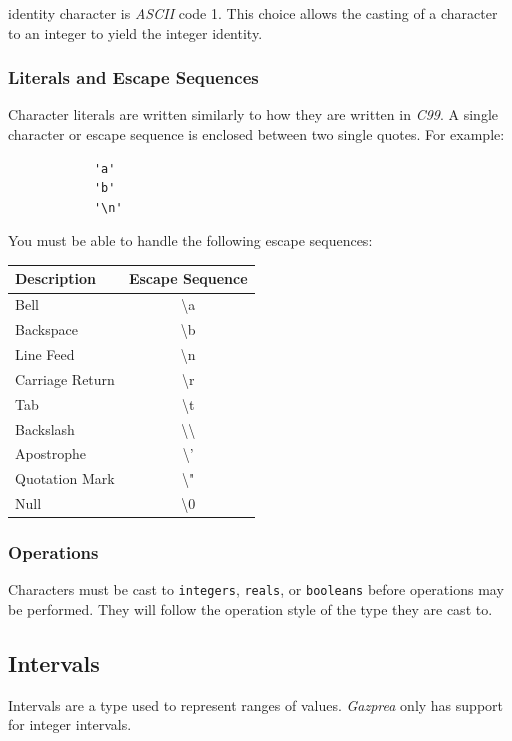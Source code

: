 \documentclass{article}
\begin{document}
		\textsf{identity} character is \textit{ASCII} code 1. This choice allows the casting of a character to an
		integer to yield the integer identity.


	\subsubsection{Literals and Escape Sequences}

		Character literals are written similarly to how they are written in \textit{C99}. A single character or escape
		sequence is enclosed between two single quotes. For example:

		\begin{lstlisting}
			'a'
			'b'
			'\n'
		\end{lstlisting}

		You must be able to handle the following escape sequences:

		\begin{center}
			\begin{tabular}{|l|c|}
				\hline
				\textbf{Description} & \textbf{Escape Sequence} \\
				\hline
				Bell            & \textbackslash{}a \\
				Backspace       & \textbackslash{}b \\
				Line Feed       & \textbackslash{}n \\
				Carriage Return & \textbackslash{}r \\
				Tab             & \textbackslash{}t \\
				Backslash       & \textbackslash{}\textbackslash{} \\
				Apostrophe      & \textbackslash{}' \\
				Quotation Mark  & \textbackslash{}" \\
				Null            & \textbackslash0   \\
				\hline
			\end{tabular}
		\end{center}

	\subsubsection{Operations}

		Characters must be cast to \texttt{integers}, \texttt{reals}, or \texttt{booleans} before operations may be
		performed. They will follow the operation style of the type they are cast to.


	\subsection{Intervals}\label{sec:interval}
		Intervals are a type used to represent ranges of values.
 		\textit{Gazprea} only has support for integer intervals.
\end{document}
